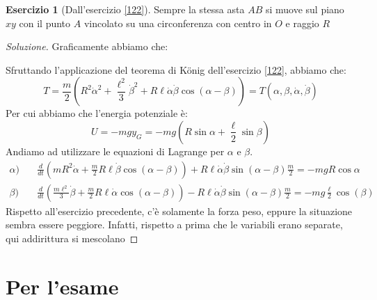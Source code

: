 \documentclass[11pt,a4paper,twoside]{article}
\theoremstyle{definition}
\newtheorem{ese}{Esercizio}[section]
\newenvironment{sol}
	{\renewcommand\qedsymbol{$\blacksquare$}\begin{proof}[Soluzione]}
	{\end{proof}}
\begin{document}
\begin{ese}[Dall'esercizio \ref{122}]
	Sempre la stessa asta $AB$ si muove sul piano $xy$ con il punto $A$ vincolato su una circonferenza con centro in $O$ e raggio $R$
\end{ese}
\begin{sol}
	Graficamente abbiamo che:
	\begin{center}
	\end{center}
	Sfruttando l'applicazione del teorema di König dell'esercizio \ref{122}, abbiamo che:
	\[ T = \frac m2 \left( R^2 \dot \alpha^2 + \frac{\ell^2}3 \dot \beta^2 + R\ell \dot \alpha \dot \beta \cos(\alpha - \beta) \right) =T(\alpha, \beta, \dot \alpha, \dot \beta) \]
	Per cui abbiamo che l'energia potenziale è:
	\[ U = -mgy_G = -mg\left( R \sin \alpha + \frac \ell 2 \sin \beta \right) \]
	Andiamo ad utilizzare le equazioni di Lagrange per $\alpha$ e $\beta$.
	\begin{align*}
		\alpha) \quad & \frac{d}{dt} \left( mR^2\dot \alpha + \frac m2 R \ell \dot \beta \cos(\alpha - \beta) \right) + R\ell \dot \alpha \dot \beta \sin(\alpha - \beta) \frac m2 = -mgR \cos \alpha\\
		\beta) \quad & \frac d{dt}\left( \frac{m\ell^2}3 \dot \beta + \frac{m}2 R\ell \dot \alpha \cos (\alpha-\beta)\right) - R\ell \dot \alpha \dot \beta \sin(\alpha - \beta)\frac m2 = -mg\frac \ell 2 \cos(\beta)
	\end{align*}
	Rispetto all'esercizio precedente, c'è solamente la forza peso, eppure la situazione sembra essere peggiore. Infatti, rispetto a prima che le variabili erano separate, qui addirittura si mescolano
\end{sol}

\newpage

\section{Per l'esame}
\end{document}

